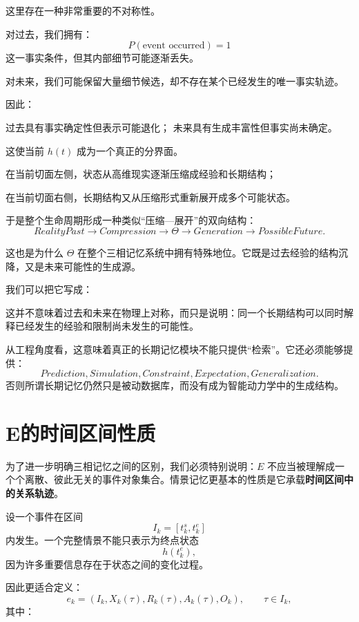 这里存在一种非常重要的不对称性。

对过去，我们拥有：
\[
P(\text{event occurred})=1
\]
这一事实条件，但其内部细节可能逐渐丢失。

对未来，我们可能保留大量细节候选，却不存在某个已经发生的唯一事实轨迹。

因此：
\begin{statementbox}
过去具有事实确定性但表示可能退化；
未来具有生成丰富性但事实尚未确定。
\end{statementbox}

这使当前 \(h(t)\) 成为一个真正的分界面。

在当前切面左侧，状态从高维现实逐渐压缩成经验和长期结构；

在当前切面右侧，长期结构又从压缩形式重新展开成多个可能状态。

于是整个生命周期形成一种类似“压缩—展开”的双向结构：
\[
RealityPast
\rightarrow
Compression
\rightarrow
\Theta
\rightarrow
Generation
\rightarrow
PossibleFuture.
\]

这也是为什么 \(\Theta\) 在整个三相记忆系统中拥有特殊地位。它既是过去经验的结构沉降，又是未来可能性的生成源。

我们可以把它写成：
\begin{statementbox}
\centering
{}
\end{statementbox}

这并不意味着过去和未来在物理上对称，而只是说明：同一个长期结构可以同时解释已经发生的经验和限制尚未发生的可能性。

从工程角度看，这意味着真正的长期记忆模块不能只提供“检索”。它还必须能够提供：
\[
Prediction,
Simulation,
Constraint,
Expectation,
Generalization.
\]
否则所谓长期记忆仍然只是被动数据库，而没有成为智能动力学中的生成结构。

\section{E的时间区间性质}

为了进一步明确三相记忆之间的区别，我们必须特别说明：\(E\) 不应当被理解成一个个离散、彼此无关的事件对象集合。情景记忆更基本的性质是它承载\textbf{时间区间中的关系轨迹}。

设一个事件在区间
\[
I_k=[t_k^s,t_k^e]
\]
内发生。一个完整情景不能只表示为终点状态
\[
h(t_k^e),
\]
因为许多重要信息存在于状态之间的变化过程。

因此更适合定义：
\[
e_k
=
\left(
I_k,
X_k(\tau),
R_k(\tau),
A_k(\tau),
O_k
\right),
\qquad
\tau\in I_k,
\]
其中：

